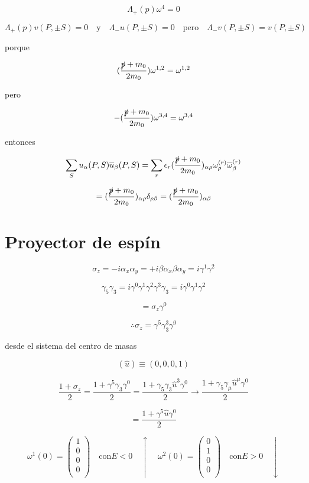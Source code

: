 \documentclass{report}
\begin{document}
\[\Lambda_{+}(p) \omega^{4} = 0 \]

\[\Lambda_{+}(p) v(P, \pm S) = 0 \quad \text{y} \quad \Lambda_{-} u(P, \pm S) = 0 \quad \text{pero} \quad \Lambda_{-}v(P, \pm S) = v (P, \pm S)\]

porque

\[(\frac{\slashed{p}+m_0 }{2m_0 }) \omega^{1,2} = \omega^{1,2}\]

pero

\[-(\frac{\slashed{p}+m_0 }{2m_0 }) \omega^{3,4} = \omega^{3,4}\]

entonces

\[\sum_{S} u_{\alpha} (P,S) \overline{u}_{\beta}(P,S) = \sum_{r} \epsilon_{r} (\frac{\slashed{p}+m_0 }{2m_0 })_{\alpha \rho} \omega_{\rho}^{(r)} \overline{\omega}_{\beta}^{(r)} \]

\begin{equation}
= (\frac{\slashed{p}+m_0 }{2m_0 })_{\alpha \rho} \delta_{\rho \beta} = (\frac{\slashed{p}+m_0 }{2m_0 })_{\alpha \beta}
\end{equation}

\section{Proyector de esp\'in}

\[\sigma_{z} = -i \alpha_{x} \alpha_{y} = +i \beta \alpha_{x} \beta \alpha_{y} = i \gamma^{1} \gamma^{2}\]

\[\gamma_{5} \gamma_{3} = i \gamma^0 \gamma^1 \gamma^2 \gamma^3 \gamma_3 = i \gamma^0 \gamma^1 \gamma^2\]

\[= \sigma_{z} \gamma^{0}\]

\[\therefore \sigma_{z} = \gamma^5 \gamma_{3}^{3} \gamma^0\]

desde el sistema del centro de masas

\[(\hat{u}) \equiv (0,0,0,1)\]

\[\frac{1+\sigma_{z}}{2} = \frac{1+\gamma^{5}\gamma_{3}\gamma^{0}}{2} = \frac{1+\gamma_{5}\gamma_{3} \hat{u}^{3} \gamma^0 }{2} \rightarrow \frac{1+ \gamma_{5} \gamma_{\mu} \hat{u}^{\mu} \gamma^{0}}{2}\]

\[= \frac{1 + \gamma^{5} \hat{u} \gamma^0 }{2}\]

\[\omega^{1}(0) = \left ( \begin{array}{cccc}
 1   \\
 0   \\
 0   \\
 0   \\
 \end{array} \right) \quad \text{con} E<0 \quad \uparrow 
 \quad \omega^{2}(0) = \left ( \begin{array}{cccc}
 0   \\
 1   \\
 0   \\
 0   \\
 \end{array} \right) \quad \text{con} E>0 \quad \downarrow \]
\end{document}
